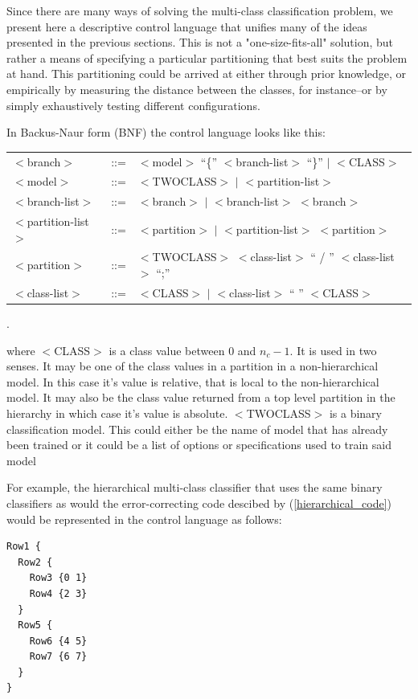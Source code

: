 Since there are many ways of solving the multi-class classification problem,
we present here a descriptive control language that unifies many of the ideas
presented in the previous sections.
This is not a "one-size-fits-all" solution, but rather a means of specifying
a particular partitioning that best suits the problem at hand.
This partitioning could be arrived at either through prior knowledge, 
or empirically by measuring the distance between the classes, for instance--or
by simply exhaustively testing different configurations.

In Backus-Naur form (BNF) the control language looks like this:

\begin{tabular}{lcl}
$<$branch$>$ & ::= & $<$model$>$ ``\{'' $<$branch-list$>$ ``\}'' $|$ $<$CLASS$>$\\
$<$model$>$  & ::= & $<$TWOCLASS$>$ $|$ $<$partition-list$>$\\
$<$branch-list$>$ & ::= & $<$branch$>$ $|$ $<$branch-list$>$ $<$branch$>$\\
$<$partition-list$>$ & ::= & $<$partition$>$ $|$ $<$partition-list$>$ $<$partition$>$\\
$<$partition$>$ & ::= & $<$TWOCLASS$>$ $<$class-list$>$ `` / '' $<$class-list$>$ ``;''\\
$<$class-list$>$ & ::= & $<$CLASS$>$ $|$ $<$class-list$>$ `` '' $<$CLASS$>$
\end{tabular}.

where $<$CLASS$>$ is a class value between 0 and $n_c-1$.  It is used in two senses.
It may be one of the class values in a partition in a non-hierarchical model.
In this case it's value is relative, that is local to the non-hierarchical model.
It may also be the class value returned
from a top level partition in the hierarchy in which case it's value is absolute.
$<$TWOCLASS$>$ is a binary classification model.
This could either be the name of model that has already been trained or it
could be a list of options or specifications used to train said model

For example, the hierarchical multi-class classifier that uses the same
binary classifiers as would the error-correcting code descibed by 
(\ref{hierarchical_code}) would be represented in the control language
as follows:

\begin{verbatim}
Row1 {
  Row2 {
    Row3 {0 1}
    Row4 {2 3}
  }
  Row5 {
    Row6 {4 5}
    Row7 {6 7}
  }
}
\end{verbatim}

